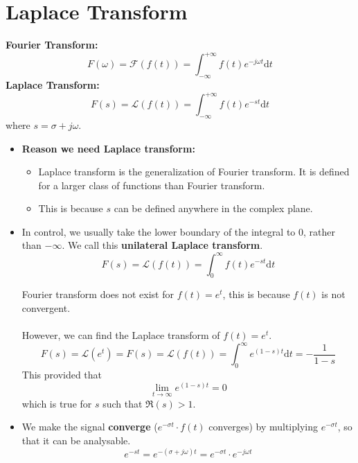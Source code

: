 \section{Laplace Transform}
\textbf{Fourier Transform:}
\[ 
    F(\omega) = \mathcal{F} (f(t)) = \int_{-\infty}^{+\infty} f(t) e^{-j\omega t} \mathrm{d}t 
\]
\textbf{Laplace Transform:}
\[ 
    F(s) = \mathcal{L} (f(t)) = \int_{-\infty}^{+\infty} f(t) e^{-st} \mathrm{d}t 
\]
\quad where $s = \sigma + j \omega$.
\ \\
\begin{itemize}
    \item \textbf{Reason we need Laplace transform:}
    \begin{itemize}
        \item  Laplace transform is the generalization of Fourier transform. It is defined for a larger class of functions than Fourier transform.
        \item This is because $s$ can be defined anywhere in the complex plane.
    \end{itemize}
    
    \item In control, we usually take the lower boundary of the integral to 0, rather than $-\infty$. We call this \textbf{unilateral Laplace transform}. \[ F(s) = \mathcal{L} (f(t)) = \int_{0}^{\infty} f(t) e^{-st} \mathrm{d}t \]
    \begin{ex}{}
     Fourier transform does not exist for $f(t)=e^{t}$, this is because $f(t)$ is not convergent.\\\\
     However, we can find the Laplace transform of  $f(t)=e^{t}$. \[ F(s) = \mathcal{L} (e^{t}) = F(s) = \mathcal{L} (f(t)) = \int_{0}^{\infty} e^{(1-s)t}  \mathrm{d}t  = -\frac{1}{1-s} \] This provided that \[ \lim_{t \to \infty} e^{(1-s)t} = 0 \] which is true for $s$ such that $\Re(s)>1$.
    \end{ex}
    \item We make the signal \textbf{converge} ($e^{-\sigma t} \cdot f(t)$ converges) by multiplying $e^{-\sigma t}$, so that it can be analysable.
    \[
    e^{-st} = e^{-(\sigma + j\omega)t} = e^{-\sigma t}\cdot e^{-j\omega t} 
    \]
\end{itemize}

